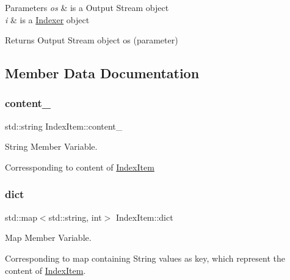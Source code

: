 \begin{DoxyParams}{Parameters}
{\em os} & is a Output Stream object \\
\hline
{\em i} & is a \hyperlink{class_indexer}{Indexer} object \\
\hline
\end{DoxyParams}
\begin{DoxyReturn}{Returns}
Output Stream object os (parameter) 
\end{DoxyReturn}


\subsection{Member Data Documentation}
\mbox{\label{class_index_item_a5d2cd643f9b1749810b4f5ea479925ed}} 
\subsubsection{\texorpdfstring{content\+\_\+}{content\_}}
{\footnotesize\ttfamily std\+::string Index\+Item\+::content\+\_\+\hspace{0.3cm}{\ttfamily [protected]}}



String Member Variable. 

Corressponding to content of \hyperlink{class_index_item}{Index\+Item} \mbox{\label{class_index_item_a819728205ae50085a6bd2456ce8c556b}} 
\subsubsection{\texorpdfstring{dict}{dict}}
{\footnotesize\ttfamily std\+::map$<$std\+::string, int$>$ Index\+Item\+::dict\hspace{0.3cm}{\ttfamily [protected]}}



Map Member Variable. 

Corresponding to map containing String values as key, which represent the content of \hyperlink{class_index_item}{Index\+Item}. \mbox{\label{class_index_item_a803a48d6e32976f6c9c42e83b10f61c5}} 
